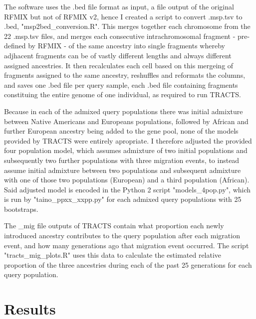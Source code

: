 \documentclass[11pt]{article}
\begin{document}
The software uses the .bed file format as input, a file output of the original RFMIX but not of RFMIX v2, hence I created a script to convert .msp.tsv to .bed, "msp2bed\_conversion.R". This merges together each chromosome from the 22 .msp.tsv files, and merges each consecutive intrachromosomal fragment - pre-defined by RFMIX - of the same ancestry into single fragments whereby adjhacent fragments can be of vastly different lengths and always different assigned ancestries. It then recalculates each cell based on this mergeing of fragments assigned to the same ancestry, reshuffles and reformats the columns, and saves one .bed file per query sample, each .bed file containing fragments constituing the entire genome of one individual, as required to run TRACTS.

Because in each of the admixed query populations there was initial admixture between Native Americans and Europeans populations, followed by African and further European ancestry being added to the gene pool, none of the models provided by TRACTS were entirely apropriate. I therefore adjusted the provided four population model, which assumes admixture of two initial populations and subsequently two further populations with three migration events, to instead assume initial admixture between two populations and subsequent admixture with one of those two populations (European) and a third population (African). Said adjusted model is encoded in the Python 2 script "models\_4pop.py", which is run by "taino\_ppxx\_xxpp.py" for each admixed query populations with 25 bootstraps.

The \_mig file outputs of TRACTS contain what proportion each newly introduced ancestry contributes to the query population after each migration event, and how many generations ago that migration event occurred. The script "tracts\_mig\_plots.R" uses this data to calculate the estimated relative proportion of the three ancestries during each of the past 25 generations for each query population. 







\vspace{8mm}
\section{Results}

\end{document}
